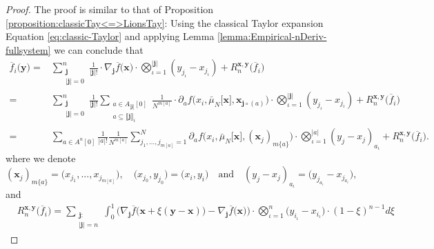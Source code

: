 \documentclass[a4paper,11pt,twoside]{article}
\numberwithin{equation}{section}
\theoremstyle{plain}
\newcommand{\1}{\mathbbm{1}}
\begin{document}
	\begin{proof}
		The proof is similar to that of Proposition \ref{proposition:classicTay<=>LionsTay}: Using the classical Taylor expansion Equation \eqref{eq:classic-Taylor} and applying Lemma \ref{lemma:Empirical-nDeriv-fullsystem} we can conclude that
		\begin{align*}
			\overline{f}_i\Big( \boldsymbol{y} \Big) =& \sum_{\substack{\boldsymbol{j} \\ |\boldsymbol{j}| = 0}}^n \frac{1}{|\boldsymbol{j}|!} \cdot \nabla_{\boldsymbol{j}} \overline{f}\Big( \boldsymbol{x} \Big) \cdot \bigotimes_{\iota=1}^{|\boldsymbol{j}|} (y_{j_{\iota}} - x_{j_{\iota}}) + R_n^{\boldsymbol{x}, \boldsymbol{y}} \big( \overline{f}_i \big)
			\\
			=& \sum_{\substack{\boldsymbol{j} \\ |\boldsymbol{j}| = 0}}^n \frac{1}{|\boldsymbol{j}|!} \sum_{\substack{a \in A_{|\boldsymbol{j}|}[0] \\ a\subseteq \llbracket \boldsymbol{j} \rrbracket_i }} \tfrac{1}{N^{m[a]}} \cdot \partial_a f \Big( x_i, \bar{\mu}_N\big[\boldsymbol{x}\big], \boldsymbol{x}_{\boldsymbol{j}\circ (a)} \Big) \cdot \bigotimes_{\iota=1}^{|\boldsymbol{j}|} (y_{j_{\iota}} - x_{j_{\iota}}) + R_n^{\boldsymbol{x}, \boldsymbol{y}} \big( \overline{f}_i \big)
			\\
			=&\sum_{a\in A^n[0]} \frac{1}{|a|!} \frac{1}{N^{m[a]}} \sum_{j_1, ..., j_{m[a]} = 1}^N \partial_a f\Big( x_i, \bar{\mu}_N\big[ \boldsymbol{x} \big], (\boldsymbol{x}_{j})_{m\{a\}} \Big) \cdot \bigotimes_{\iota=1}^{|a|} (y_j - x_j)_{a_\iota} + R_n^{\boldsymbol{x}, \boldsymbol{y}} \big( \overline{f}_i \big). 
		\end{align*}
		where we denote 
		\begin{equation*}
			(\boldsymbol{x}_j)_{m\{a\}} = \big( x_{j_1}, ..., x_{j_{m[a]}} \big), 
			\quad
			\big( x_{j_0}, y_{j_0} \big) = \big( x_i, y_i \big)
			\quad \mbox{and}\quad 
			(y_j - x_j)_{a_{\iota}} = \big( y_{j_{a_{\iota}}} - x_{j_{a_{\iota}}} \big), 
		\end{equation*}
		and
		\begin{align*}
			&R_n^{\boldsymbol{x}, \boldsymbol{y}}\big( \overline{f}_i \big) = \sum_{\substack{\boldsymbol{j}: \\ |\boldsymbol{j}| = n}} \int_0^1 \bigg( \nabla_{\boldsymbol{j}} \overline{f}\Big( \boldsymbol{x} + \xi(\boldsymbol{y}-\boldsymbol{x}) \Big)  - \nabla_{\boldsymbol{j}} \overline{f}\Big( \boldsymbol{x} \Big) \bigg) \cdot \bigotimes_{\iota=1}^n \big( y_{i_\iota} - x_{i_\iota} \big) \cdot (1-\xi)^{n-1} d\xi

\end{align*}
\end{proof}
\end{document}
